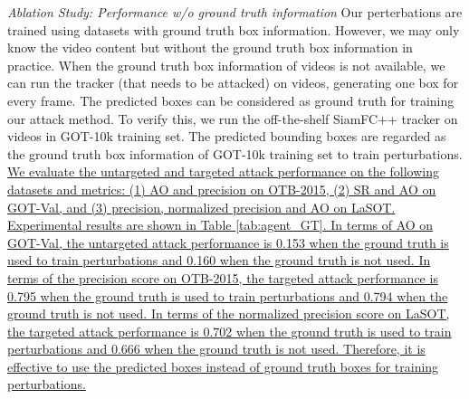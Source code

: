 \documentclass[journal]{IEEEtran}
\begin{document}
\textit{Ablation Study: Performance w/o ground truth information} Our perterbations are trained using datasets with ground truth box information.
However, we may only know the video content but without the ground truth box information in practice. When the ground truth box information of videos is not available, we can run the tracker (that needs to be attacked) on videos, generating one box for every frame. The predicted boxes can be considered as ground truth for training our attack method. To verify this, we run the off-the-shelf SiamFC++ tracker on videos in GOT-10k training set. The predicted bounding boxes are regarded as the ground truth box information of GOT-10k training set to train perturbations.
\uline{We evaluate the untargeted and targeted attack performance on the following datasets and metrics: (1) AO and precision on OTB-2015, (2) SR and AO on GOT-Val, and (3) precision, normalized precision and AO on LaSOT.
Experimental results are shown in Table \ref{tab:agent_GT}.
In terms of AO on GOT-Val, the untargeted attack performance is 0.153 when the ground truth is used to train perturbations and 0.160 when the ground truth is not used.
In terms of the precision score on OTB-2015, the targeted attack performance is 0.795 when the ground truth is used to train perturbations and 0.794 when the ground truth is not used.
In terms of the normalized precision score on LaSOT, the targeted attack performance is 0.702 when the ground truth is used to train perturbations and 0.666 when the ground truth is not used.
Therefore, it is effective to use the predicted boxes instead of ground truth boxes for training perturbations.
}
\end{document}
